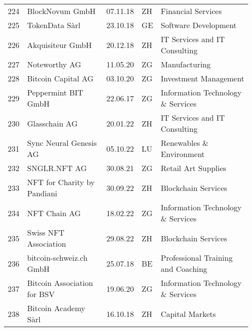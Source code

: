\begin{tabular}{lllll}
224 &                                    BlockNovum GmbH &      07.11.18 &     ZH &                             Financial Services \\
225 &                                     TokenData Sàrl &      23.10.18 &     GE &                           Software Development \\
226 &                                   Akquisiteur GmbH &      20.12.18 &     ZH &                  IT Services and IT Consulting \\
227 &                                      Noteworthy AG &      11.05.20 &     ZG &                                  Manufacturing \\
228 &                                 Bitcoin Capital AG &      03.10.20 &     ZG &                          Investment Management \\
229 &                                Peppermint BIT GmbH &      22.06.17 &     ZG &              Information Technology \& Services \\
230 &                                      Glasschain AG &      20.01.22 &     ZH &                  IT Services and IT Consulting \\
231 &                             Sync Neural Genesis AG &      05.10.22 &     LU &                       Renewables \& Environment \\
232 &                                       SNGLR.NFT AG &      30.08.21 &     ZG &                            Retail Art Supplies \\
233 &                        NFT for Charity by Pandiani &      30.09.22 &     ZH &                            Blockchain Services \\
234 &                                       NFT Chain AG &      18.02.22 &     ZG &              Information Technology \& Services \\
235 &                              Swiss NFT Association &      29.08.22 &     ZH &                            Blockchain Services \\
236 &                            bitcoin-schweiz.ch GmbH &      25.07.18 &     BE &             Professional Training and Coaching \\
237 &                        Bitcoin Association for BSV &      19.06.20 &     ZG &              Information Technology \& Services \\
238 &                               Bitcoin Academy Sàrl &      16.10.18 &     ZH &                                Capital Markets \\

\end{tabular}
